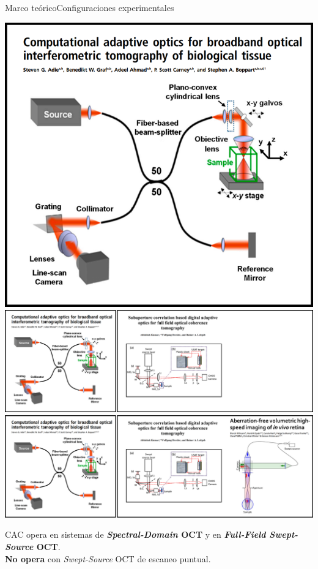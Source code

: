\documentclass[fleqn,10pt,aspectratio=169,dvipsnames]{beamer}
\begin{document}
\begin{frame}[c]{Marco teórico}{Configuraciones experimentales}
	\begin{overprint}
\hspace{-\baselineskip}
\includegraphics[height=.5\textheight]{Figuras/SD-OCT.png}
\includegraphics[height=.5\textheight]{Figuras/FF-SSOCT_1.png}
\includegraphics[height=.5\textheight]{Figuras/FF-SSOCT_2.png}
	\end{overprint}
	\begin{centering}
{
{\small CAC opera en sistemas de \textbf{\textit{Spectral-Domain} OCT} y en \textbf{\textit{Full-Field Swept-Source} OCT}. \\
}
}
{\textbf{{\color{red}No opera}} con \textit{Swept-Source} OCT de escaneo puntual. \\
}
	\end{centering}

\end{frame}
\end{document}
